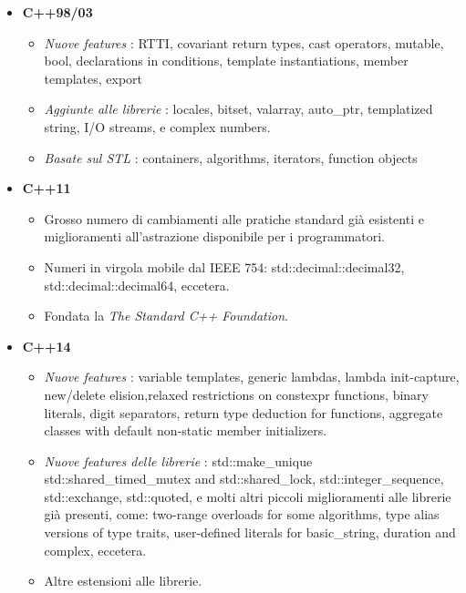 \begin{itemize}
	\item \textsf{\small \textbf{C++98/03}}
	\begin{itemize}
		\item \textsf{\small \emph{Nuove features} : RTTI, covariant return types, cast operators, mutable, bool, declarations in conditions, template instantiations, member templates, export}
		\item \textsf{\small \emph{Aggiunte alle librerie} : locales, bitset, valarray, auto\_ptr, templatized string, I/O streams, e complex numbers.}
		\item \textsf{\small \emph{Basate sul STL} :  containers, algorithms, iterators, function objects}
	\end{itemize}
	\item \textsf{\small \textbf{C++11}}
	\begin{itemize}
		\item \textsf{\small Grosso numero di cambiamenti alle pratiche standard già esistenti e miglioramenti all'astrazione disponibile per i programmatori.}
		\item \textsf{\small Numeri in virgola mobile dal IEEE 754: std::decimal::decimal32, \\ std::decimal::decimal64, eccetera.} %
		\item \textsf{\small Fondata la \emph{The Standard C++ Foundation}.}
	\end{itemize}
	\item \textsf{\small \textbf{C++14}}
	\begin{itemize}
		\item \textsf{\small \emph{Nuove features} : variable templates, generic lambdas, lambda init-capture, new/delete elision,relaxed restrictions on constexpr functions, binary literals, digit separators, return type deduction for functions, aggregate classes with default non-static member initializers.}
		\item \textsf{\small \emph{Nuove features delle librerie} : std::make\_unique
			std::shared\_timed\_mutex and std::shared\_lock, std::integer\_sequence, std::exchange, std::quoted, e molti altri piccoli miglioramenti alle librerie già presenti, come: two-range overloads for some algorithms, type alias versions of type traits, user-defined literals for basic\_string, duration and complex, eccetera.}
		\item \textsf{\small Altre estensioni alle librerie.}
	\end{itemize}

\end{itemize}
